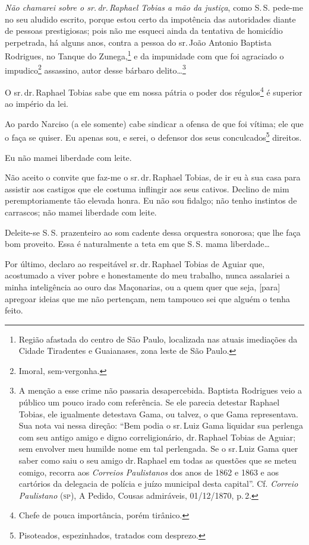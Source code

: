 \emph{Não chamarei sobre o sr.\,dr.\,Raphael Tobias a mão da justiça},
como S.\,S. pede-me no seu aludido escrito, porque estou certo da
impotência das autoridades diante de pessoas prestigiosas; pois não me
esqueci ainda da tentativa de homicídio perpetrada, há alguns anos,
contra a pessoa do sr.\,João Antonio Baptista Rodrigues, no Tanque do
Zunega,\footnote{ Região afastada do centro de São Paulo, localizada
  nas atuais imediações da Cidade Tiradentes e Guaianases, zona leste de
  São Paulo.} e da impunidade com que foi agraciado o
impudico\footnote{ Imoral, sem-vergonha.} assassino, autor desse
bárbaro delito\ldots{}\footnote{ A menção a esse crime não passaria
  desapercebida. Baptista Rodrigues veio a público um pouco irado com
  referência. Se ele parecia detestar Raphael Tobias, ele igualmente
  detestava Gama, ou talvez, o que Gama representava. Sua nota vai nessa
  direção: ``Bem podia o sr.\,Luiz Gama liquidar sua perlenga com seu
  antigo amigo e digno correligionário, dr.\,Raphael Tobias de Aguiar;
  sem envolver meu humilde nome em tal perlengada. Se o sr.\,Luiz Gama
  quer saber como saiu o seu amigo dr.\,Raphael em todas as questões que
  se meteu comigo, recorra aos \emph{Correios Paulistanos} dos anos de
  1862 e 1863 e aos cartórios da delegacia de polícia e juízo municipal
  desta capital''. Cf. \emph{Correio Paulistano} (\textsc{sp}), A Pedido,
  Cousas admiráveis, 01/12/1870, p.\,2.}

O sr.\,dr.\,Raphael Tobias sabe que em nossa pátria o poder dos
régulos\footnote{ Chefe de pouca importância, porém tirânico.} é
superior ao império da lei.

Ao pardo Narciso (a ele somente) cabe sindicar a ofensa de que foi
vítima; ele que o faça se quiser. Eu apenas sou, e serei, o defensor dos
seus conculcados\footnote{ Pisoteados, espezinhados, tratados com
  desprezo.} direitos.

Eu não mamei liberdade com leite.

Não aceito o convite que faz-me o sr.\,dr.\,Raphael Tobias, de ir eu à sua
casa para assistir aos castigos que ele costuma inflingir aos seus
cativos. Declino de mim peremptoriamente tão elevada honra. Eu não sou
fidalgo; não tenho instintos de carrascos; não mamei liberdade com
leite.

Deleite-se S.\,S. prazenteiro ao som cadente dessa orquestra sonorosa;
que lhe faça bom proveito. Essa é naturalmente a teta em que S.\,S. mama
liberdade\ldots{}

Por último, declaro ao respeitável sr.\,dr.\,Raphael Tobias de Aguiar que,
acostumado a viver pobre e honestamente do meu trabalho, nunca
assalariei a minha inteligência ao ouro das Maçonarias, ou a quem quer
que seja, {[}para{]} apregoar ideias que me não pertençam, nem tampouco
sei que alguém o tenha feito.

